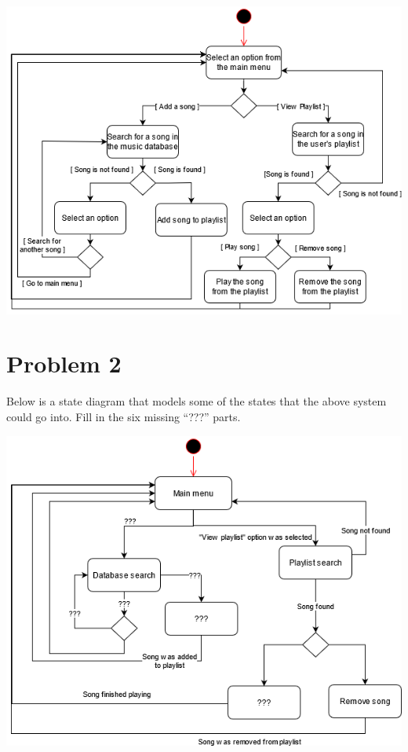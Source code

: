 \documentclass{article}
\begin{document}
    \begin{center}
        \includegraphics[scale=0.55]{Problem1.png}
    \end{center}



    \section*{Problem 2}

    Below is a state diagram that models some of the states that the above system could go
    into. Fill in the six missing “???” parts.

    \begin{center}
        \includegraphics[scale=0.55]{Problem2_Example.png}
    \end{center}
    
\end{document}
